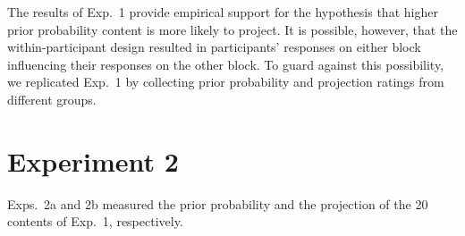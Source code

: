 \documentclass[11pt,fleqn]{article}
\newcommand{\jt}[1]{\textbf{\color{blue}JT: #1}}
\newcommand{\6}{\mbox{$[\hspace*{-.6mm}[$}}
\newcommand{\9}{\mbox{$]\hspace*{-.6mm}]$}}
\begin{document}
%
%
%


The results of Exp.~1 provide empirical support for the hypothesis that higher prior probability content is more likely to project. It is possible, however, that the within-participant design resulted in participants' responses on either block influencing their responses on the other block. To guard against this possibility, we replicated Exp.~1 by collecting prior probability and projection ratings from different groups.  

\section{Experiment 2}\label{s3}

Exps.~2a and 2b measured the prior probability and the projection of the 20 contents of Exp.~1, respectively.
\end{document}
